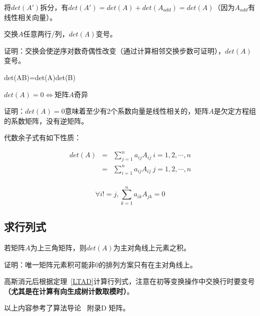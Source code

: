 将$det(A')$拆分，有$det(A')=det(A)+det(A_{add})=det(A)$（因为$A_{add}$有线性相关向量）。
\begin{property}
	交换$A$任意两行/列，$det(A)$变号。
\end{property}

证明：交换会使逆序对数奇偶性改变（通过计算相邻交换步数可证明），$det(A)$变号。
\begin{property}
	det(AB)=det(A)det(B)
\end{property}
\begin{theorem}
	$det(A)=0\Leftrightarrow$矩阵$A$奇异
\end{theorem}

证明：$det(A)=0$意味着至少有2个系数向量是线性相关的，矩阵$A$是欠定方程组的系数矩阵，没有逆矩阵。

代数余子式有如下性质：
\begin{property}
    \begin{eqnarray*}
        det(A)&=&\sum_{j=1}^n{a_{ij}A_{ij}} ~i=1,2,\cdots,n\\
        &=&\sum_{i=1}^n{a_{ij}A_{ij}} ~j=1,2,\cdots,n\\
    \end{eqnarray*}
\end{property}
\begin{property}
    \begin{displaymath}
        \forall i!=j,\sum_{k=1}^n{a_{ik}A_{jk}}=0
    \end{displaymath}
\end{property}
\subsection{求行列式}
\begin{theorem}\label{LTAD}
	若矩阵$A$为上三角矩阵，则$det(A)$为主对角线上元素之积。
\end{theorem}

证明：唯一矩阵元素积可能非0的排列方案只有在主对角线上。

高斯消元后根据定理~\ref{LTAD}计算行列式，注意在初等变换操作中交换行时要变号
{\bfseries （尤其是在计算有向生成树计数取模时）}。

以上内容参考了算法导论~\cite{ITA3} 附录D 矩阵。

